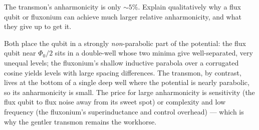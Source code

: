 \begin{exercise}
The transmon's anharmonicity is only $\sim5\%$. Explain qualitatively
why a flux qubit or fluxonium can achieve much larger relative
anharmonicity, and what they give up to get it.
\begin{solution}
Both place the qubit in a strongly \emph{non}-parabolic part of the
potential: the flux qubit near $\Phi_0/2$ sits in a double-well whose
two minima give well-separated, very unequal levels; the fluxonium's
shallow inductive parabola over a corrugated cosine yields levels with
large spacing differences. The transmon, by contrast, lives at the
bottom of a single deep well where the potential is nearly parabolic,
so its anharmonicity is small. The price for large anharmonicity is
sensitivity (the flux qubit to flux noise away from its sweet spot) or
complexity and low frequency (the fluxonium's superinductance and
control overhead) --- which is why the gentler transmon remains the
workhorse.
\end{solution}
\end{exercise}
